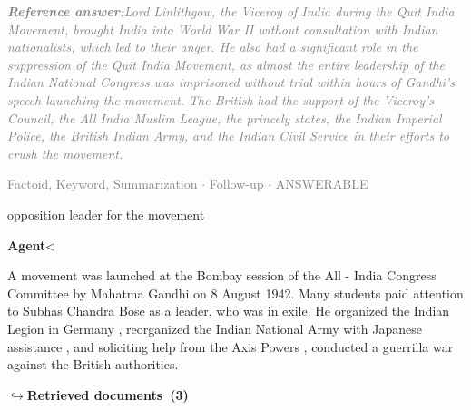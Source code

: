 \documentclass[a4paper,11pt]{article}
\begin{document}
\begin{refanswerenv}
{\footnotesize\textit{\textcolor{gray}{\textbf{Reference answer:}\enspace Lord Linlithgow, the Viceroy of India during the Quit India Movement, brought India into World War II without consultation with Indian nationalists, which led to their anger. He also had a significant role in the suppression of the Quit India Movement, as almost the entire leadership of the Indian National Congress was imprisoned without trial within hours of Gandhi's speech launching the movement. The British had the support of the Viceroy's Council, the All India Muslim League, the princely states, the Indian Imperial Police, the British Indian Army, and the Indian Civil Service in their efforts to crush the movement.}}}
\end{refanswerenv}
\vspace{0.5em}
\hfill{\tiny\textcolor{gray}{Factoid, Keyword, Summarization $\cdot$ Follow-up $\cdot$ ANSWERABLE}}
\begin{userbubble}
opposition leader for the movement
\end{userbubble}
\noindent\hfill{\small\textcolor{agentcolor}{\textbf{Agent\enspace$\triangleleft$}}}
\begin{agentbubble}
A movement was launched at the Bombay session of the All - India Congress Committee by Mahatma Gandhi on 8 August 1942.  Many students paid attention to Subhas Chandra Bose as a leader,  who was in exile. He organized the Indian Legion in Germany , reorganized the Indian National Army with Japanese assistance , and soliciting help from the Axis Powers , conducted a guerrilla war against the British authorities.  
\end{agentbubble}
\noindent\hfill{\footnotesize\textcolor{doccolor}{\textbf{$\hookrightarrow$\enspace Retrieved documents~(3)}}}
\end{document}
